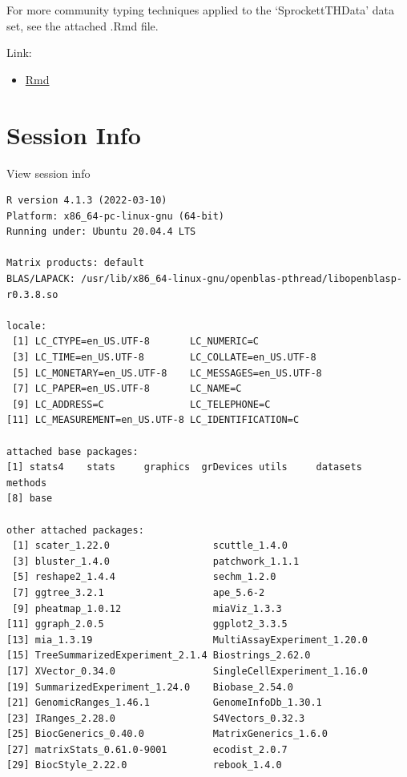 \documentclass[
]{book}
\providecommand{\tightlist}{%
  \setlength{\itemsep}{0pt}\setlength{\parskip}{0pt}}
\begin{document}
For more community typing techniques applied to the `SprockettTHData' data set, see the attached .Rmd file.

Link:

\begin{itemize}
\tightlist
\item
  \href{add-comm-typing.Rmd}{Rmd}
\end{itemize}

\hypertarget{session-info-6}{%
\section*{Session Info}\label{session-info-6}}

View session info

\begin{verbatim}
R version 4.1.3 (2022-03-10)
Platform: x86_64-pc-linux-gnu (64-bit)
Running under: Ubuntu 20.04.4 LTS

Matrix products: default
BLAS/LAPACK: /usr/lib/x86_64-linux-gnu/openblas-pthread/libopenblasp-r0.3.8.so

locale:
 [1] LC_CTYPE=en_US.UTF-8       LC_NUMERIC=C              
 [3] LC_TIME=en_US.UTF-8        LC_COLLATE=en_US.UTF-8    
 [5] LC_MONETARY=en_US.UTF-8    LC_MESSAGES=en_US.UTF-8   
 [7] LC_PAPER=en_US.UTF-8       LC_NAME=C                 
 [9] LC_ADDRESS=C               LC_TELEPHONE=C            
[11] LC_MEASUREMENT=en_US.UTF-8 LC_IDENTIFICATION=C       

attached base packages:
[1] stats4    stats     graphics  grDevices utils     datasets  methods  
[8] base     

other attached packages:
 [1] scater_1.22.0                  scuttle_1.4.0                 
 [3] bluster_1.4.0                  patchwork_1.1.1               
 [5] reshape2_1.4.4                 sechm_1.2.0                   
 [7] ggtree_3.2.1                   ape_5.6-2                     
 [9] pheatmap_1.0.12                miaViz_1.3.3                  
[11] ggraph_2.0.5                   ggplot2_3.3.5                 
[13] mia_1.3.19                     MultiAssayExperiment_1.20.0   
[15] TreeSummarizedExperiment_2.1.4 Biostrings_2.62.0             
[17] XVector_0.34.0                 SingleCellExperiment_1.16.0   
[19] SummarizedExperiment_1.24.0    Biobase_2.54.0                
[21] GenomicRanges_1.46.1           GenomeInfoDb_1.30.1           
[23] IRanges_2.28.0                 S4Vectors_0.32.3              
[25] BiocGenerics_0.40.0            MatrixGenerics_1.6.0          
[27] matrixStats_0.61.0-9001        ecodist_2.0.7                 
[29] BiocStyle_2.22.0               rebook_1.4.0                  


\end{verbatim}
\end{document}
